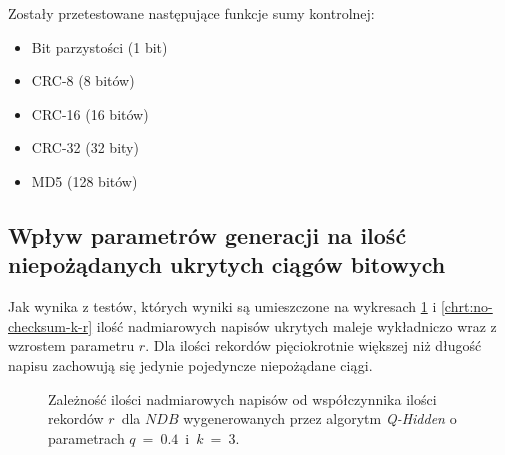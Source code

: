 Zostały przetestowane następujące funkcje sumy kontrolnej:

\begin{itemize}
    \item Bit parzystości (1 bit)
    \item CRC-8 (8 bitów)
    \item CRC-16 (16 bitów)
    \item CRC-32 (32 bity)
    \item MD5 (128 bitów)
\end{itemize}
\subsection{Wpływ parametrów generacji na ilość niepożądanych ukrytych ciągów bitowych}

Jak wynika z testów, których wyniki są umieszczone na wykresach \ref{chrt:no-checksum-q-r} i \ref{chrt:no-checksum-k-r}
ilość nadmiarowych napisów ukrytych maleje wykładniczo wraz z wzrostem parametru $r$. Dla ilości rekordów pięciokrotnie większej niż długość napisu
zachowują się jedynie pojedyncze niepożądane ciągi. 

\begin{figure}[!h]
    \centering
    \caption{Zależność ilości nadmiarowych napisów od współczynnika ilości rekordów $r$~dla $NDB$
        wygenerowanych przez algorytm \textit{Q-Hidden} o parametrach $q~=~0.4$~i~$k~=~3$.}
    \label{chrt:no-checksum-q-r}
\end{figure}

